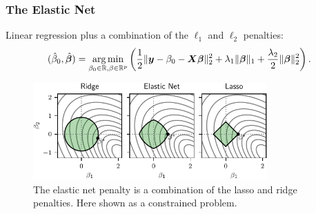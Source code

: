 \documentclass[10pt]{beamer}
\begin{document}
\begin{frame}[c]
  \frametitle{The Elastic Net}

  Linear regression plus a combination of the \(\ell_1\) and \(\ell_2\) penalties:
  \begin{equation*}
    (\hat{\beta}_0, \hat{\bm{\beta}}) = \operatorname*{arg\,min}_{\beta_0 \in \mathbb{R},\beta \in \mathbb{R}^p} \left( \frac{1}{2} \lVert \bm{y} - \beta_0 - \bm{X}\bm{\beta} \rVert^2_2  + \lambda_1 \lVert \bm{\beta} \rVert_1 + \frac{\lambda_2}{2}\lVert \bm{\beta} \rVert_2^2\right).
  \end{equation*}

  \pause

  \begin{figure}
    \centering
    \includegraphics[width=0.8\textwidth]{figures/paper6-elasticnet-balls.pdf}
    \caption{%
      The elastic net penalty is a combination of the lasso and ridge penalties. Here shown as a constrained problem.
    }
  \end{figure}

\end{frame}
\end{document}
